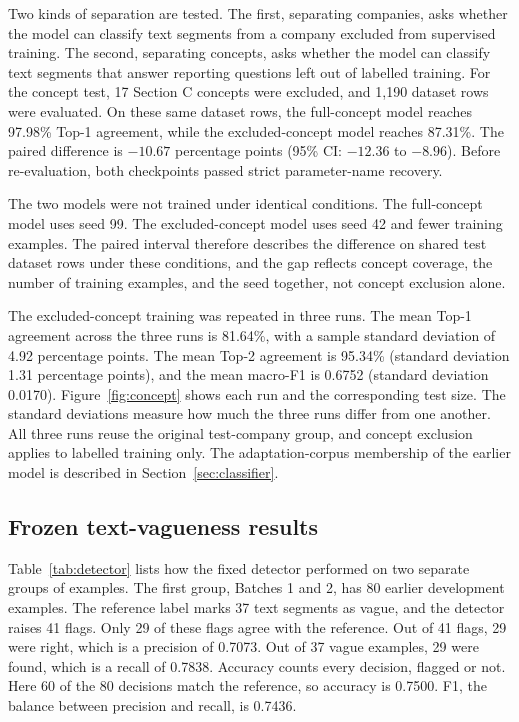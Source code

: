 Two kinds of separation are tested. The first, separating companies, asks whether the model can classify text segments from a company excluded from supervised training. The second, separating concepts, asks whether the model can classify text segments that answer reporting questions left out of labelled training. For the concept test, 17 Section C concepts were excluded, and 1,190 dataset rows were evaluated. On these same dataset rows, the full-concept model reaches 97.98\% Top-1 agreement, while the excluded-concept model reaches 87.31\%. The paired difference is $-10.67$ percentage points (95\% CI: $-12.36$ to $-8.96$). Before re-evaluation, both checkpoints passed strict parameter-name recovery.

The two models were not trained under identical conditions. The full-concept model uses seed 99. The excluded-concept model uses seed 42 and fewer training examples. The paired interval therefore describes the difference on shared test dataset rows under these conditions, and the gap reflects concept coverage, the number of training examples, and the seed together, not concept exclusion alone.

The excluded-concept training was repeated in three runs. The mean Top-1 agreement across the three runs is 81.64\%, with a sample standard deviation of 4.92 percentage points. The mean Top-2 agreement is 95.34\% (standard deviation 1.31 percentage points), and the mean macro-F1 is 0.6752 (standard deviation 0.0170). Figure~\ref{fig:concept} shows each run and the corresponding test size. The standard deviations measure how much the three runs differ from one another. All three runs reuse the original test-company group, and concept exclusion applies to labelled training only. The adaptation-corpus membership of the earlier model is described in Section~\ref{sec:classifier}.



\subsection{Frozen text-vagueness results}

Table~\ref{tab:detector} lists how the fixed detector performed on two separate groups of examples. The first group, Batches 1 and 2, has 80 earlier development examples. The reference label marks 37 text segments as vague, and the detector raises 41 flags. Only 29 of these flags agree with the reference. Out of 41 flags, 29 were right, which is a precision of 0.7073. Out of 37 vague examples, 29 were found, which is a recall of 0.7838. Accuracy counts every decision, flagged or not. Here 60 of the 80 decisions match the reference, so accuracy is 0.7500. F1, the balance between precision and recall, is 0.7436.

